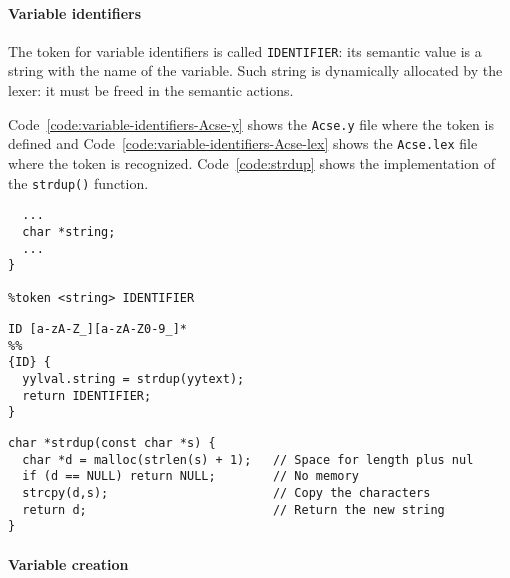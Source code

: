 \paragraph*{Variable identifiers}

The token for variable identifiers is called \texttt{IDENTIFIER}:
its semantic value is a \clang string with the name of the variable.
Such string is dynamically allocated by the lexer: it must be freed in the semantic actions.

Code~\ref{code:variable-identifiers-Acse-y} shows the \texttt{Acse.y} file where the token is defined and Code~\ref{code:variable-identifiers-Acse-lex} shows the \texttt{Acse.lex} file where the token is recognized.
Code~\ref{code:strdup} shows the implementation of the \clang \texttt{strdup()} function.

\begin{onepage}
  \begin{lstlisting}[language=LANCE, caption={Content of \texttt{Acse.y} file}, label={code:variable-identifiers-Acse-y}]
%union {
  ...
  char *string;
  ...
}

%token <string> IDENTIFIER
\end{lstlisting}
\end{onepage}

\begin{onepage}
  \begin{lstlisting}[language=LANCE, caption={Content of \texttt{Acse.lex} file}, label={code:variable-identifiers-Acse-lex}]
ID [a-zA-Z_][a-zA-Z0-9_]*
%%
{ID} {
  yylval.string = strdup(yytext);
  return IDENTIFIER;
}
\end{lstlisting}
\end{onepage}

\begin{onepage}
  \begin{lstlisting}[language=LANCE, caption={\texttt{stdrup()} function}, label={code:strdup}]
char *strdup(const char *s) {
  char *d = malloc(strlen(s) + 1);   // Space for length plus nul
  if (d == NULL) return NULL;        // No memory
  strcpy(d,s);                       // Copy the characters
  return d;                          // Return the new string
}
\end{lstlisting}
\end{onepage}

\paragraph{Variable creation}

